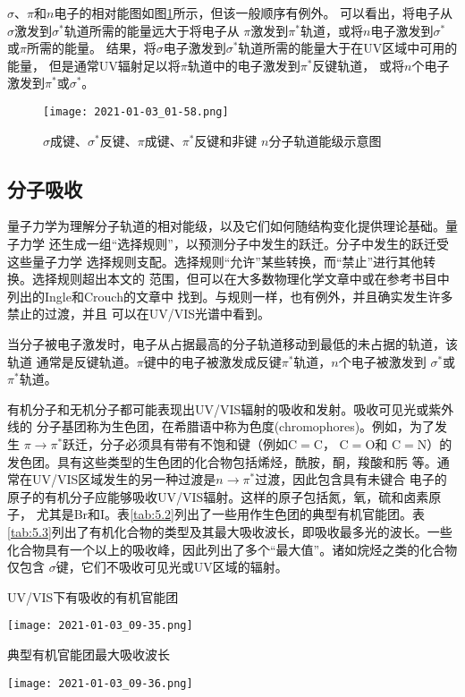$\sigma$、$\pi$和$n$电子的相对能图如图\ref{fig:5.8}所示，但该一般顺序有例外。
可以看出，将电子从$\sigma$激发到$\sigma^\ast$轨道所需的能量远大于将电子从
$\pi$激发到$\pi^\ast$轨道，或将$n$电子激发到$\sigma^\ast$或$\pi$所需的能量。
结果，将$\sigma$电子激发到$\sigma^\ast$轨道所需的能量大于在UV区域中可用的能量，
但是通常UV辐射足以将$\pi$轨道中的电子激发到$\pi^\ast$反键轨道，
或将$n$个电子激发到$\pi^\ast$或$\sigma^\ast$。
\begin{figure}[htpb]
    \centering
    \texttt{[image: 2021-01-03\_01-58.png]}
    \caption{$\sigma$成键、$\sigma^\ast$反键、$\pi$成键、$\pi^\ast$反键和非键
    $n$分子轨道能级示意图}
    \label{fig:5.8}
\end{figure}
\subsection{分子吸收}
量子力学为理解分子轨道的相对能级，以及它们如何随结构变化提供理论基础。量子力学
还生成一组“选择规则”，以预测分子中发生的跃迁。分子中发生的跃迁受这些量子力学
选择规则支配。选择规则“允许”某些转换，而“禁止”进行其他转换。选择规则超出本文的
范围，但可以在大多数物理化学文章中或在参考书目中列出的Ingle和Crouch的文章中
找到。与规则一样，也有例外，并且确实发生许多禁止的过渡，并且
可以在UV/VIS光谱中看到。

当分子被电子激发时，电子从占据最高的分子轨道移动到最低的未占据的轨道，该轨道
通常是反键轨道。$\pi$键中的电子被激发成反键$\pi^\ast$轨道，$n$个电子被激发到
$\sigma^\ast$或$\pi^\ast$轨道。

有机分子和无机分子都可能表现出UV/VIS辐射的吸收和发射。吸收可见光或紫外线的
分子基团称为生色团，在希腊语中称为色度(chromophores)。例如，为了发生
$\pi\to\pi^\ast$跃迁，分子必须具有带有不饱和键（例如C$=$C， C$=$O和
C$=$N）的发色团。具有这些类型的生色团的化合物包括烯烃，酰胺，酮，羧酸和肟
等。通常在UV/VIS区域发生的另一种过渡是$n\to\pi^\ast$过渡，因此包含具有未键合
电子的原子的有机分子应能够吸收UV/VIS辐射。这样的原子包括氮，氧，硫和卤素原子，
尤其是Br和I。表\ref{tab:5.2}列出了一些用作生色团的典型有机官能团。表
\ref{tab:5.3}列出了有机化合物的类型及其最大吸收波长，即吸收最多光的波长。一些
化合物具有一个以上的吸收峰，因此列出了多个“最大值”。诸如烷烃之类的化合物仅包含
$\sigma$键，它们不吸收可见光或UV区域的辐射。
\begin{table}[htbp]
    \centering
    \caption{UV/VIS下有吸收的有机官能团}
    \texttt{[image: 2021-01-03\_09-35.png]}
    \label{tab:5.2}
\end{table}
\begin{table}[htbp]
    \centering
    \caption{典型有机官能团最大吸收波长}
    \texttt{[image: 2021-01-03\_09-36.png]}
    \label{tab:5.3}
\end{table}


